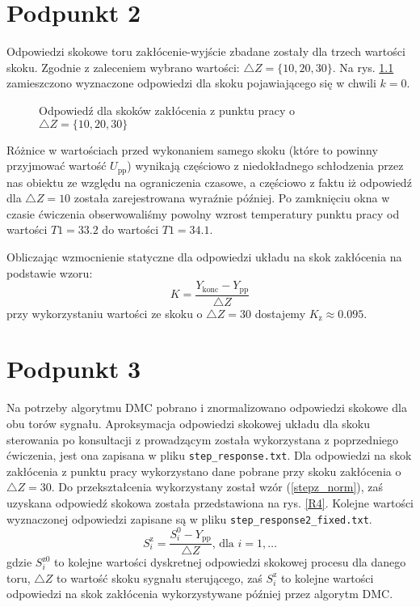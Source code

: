 \chapter{Podpunkt 2}
Odpowiedzi skokowe toru zakłócenie-wyjście zbadane zostały dla trzech wartości skoku. Zgodnie z zaleceniem wybrano wartości: $\triangle Z = \{10, 20, 30\}$. Na rys. \ref{R2} zamieszczono wyznaczone odpowiedzi dla skoku pojawiającego się w chwili $k=\num{0}$.

\begin{figure}[ht]
\centering

\caption{Odpowiedź dla skoków zakłócenia z punktu pracy o $\triangle Z = \{10, 20, 30\}$}
\label{R2}
\end{figure}

Różnice w wartościach przed wykonaniem samego skoku (które to powinny przyjmować wartość $U_{\mathrm{pp}}$) wynikają częściowo z niedokładnego schłodzenia przez nas obiektu ze względu na ograniczenia czasowe, a częściowo z faktu iż odpowiedź dla $\triangle Z=10$ została zarejestrowana wyraźnie później. Po zamknięciu okna w czasie ćwiczenia obserwowaliśmy powolny wzrost temperatury punktu pracy od wartości $T1=\num{33,2}$ do wartości $T1=\num{34,1}$.

Obliczając wzmocnienie statyczne dla odpowiedzi układu na skok zakłócenia na podstawie wzoru:
\begin{equation}
K=\frac{Y_{\mathrm{konc}}-Y_{\mathrm{pp}}}{\triangle Z}
\end{equation}
przy wykorzystaniu wartości ze skoku o $ \triangle Z = 30 $ dostajemy $K_{\mathrm{z}} \approx \num{0.095}$.


\chapter{Podpunkt 3}
Na potrzeby algorytmu DMC pobrano i znormalizowano odpowiedzi skokowe dla obu torów sygnału. Aproksymacja odpowiedzi skokowej układu dla skoku sterowania po konsultacji z prowadzącym została wykorzystana z poprzedniego ćwiczenia, jest ona zapisana w pliku \verb|step_response.txt|. Dla odpowiedzi na skok zakłócenia z punktu pracy wykorzystano dane pobrane przy skoku zakłócenia o $\triangle Z = 30$. Do przekształcenia wykorzystany został wzór (\ref{stepz_norm}), zaś uzyskana odpowiedź skokowa została przedstawiona na rys. \ref{R4}. Kolejne wartości wyznaczonej odpowiedzi zapisane są w pliku \verb+step_response2_fixed.txt+.
\begin{equation}
S_i^{\mathrm{z}} = \frac{S_i^0 - Y_{\mathrm{pp}}}{\triangle Z} \textrm{, dla } i=1,\ldots
\label{stepz_norm}
\end{equation}
gdzie $S_i^{\mathrm{z}0}$ to kolejne wartości dyskretnej odpowiedzi skokowej procesu dla danego toru, $\triangle Z$ to wartość skoku sygnału sterującego, zaś $S_i^{\mathrm{z}}$ to kolejne wartości odpowiedzi na skok zakłócenia wykorzystywane później przez algorytm DMC.

